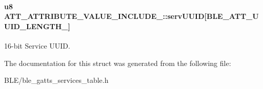 \paragraph[{\texorpdfstring{serv\+U\+U\+ID}{servUUID}}]{\setlength{\rightskip}{0pt plus 5cm}u8 A\+T\+T\+\_\+\+A\+T\+T\+R\+I\+B\+U\+T\+E\+\_\+\+V\+A\+L\+U\+E\+\_\+\+I\+N\+C\+L\+U\+D\+E\+\_\+::serv\+U\+U\+ID\mbox{[}{\bf B\+L\+E\+\_\+\+A\+T\+T\+\_\+\+U\+U\+I\+D\+\_\+\+L\+E\+N\+G\+T\+H\+\_}\mbox{]}}\hypertarget{struct_a_t_t___a_t_t_r_i_b_u_t_e___v_a_l_u_e___i_n_c_l_u_d_e__2_ad29d72d3f2e52b70f05a378ff68b2a3b}{}\label{struct_a_t_t___a_t_t_r_i_b_u_t_e___v_a_l_u_e___i_n_c_l_u_d_e__2_ad29d72d3f2e52b70f05a378ff68b2a3b}
16-\/bit Service U\+U\+ID. 

The documentation for this struct was generated from the following file\+:\begin{DoxyCompactItemize}
\item 
B\+L\+E/ble\+\_\+gatts\+\_\+services\+\_\+table.\+h\end{DoxyCompactItemize}
